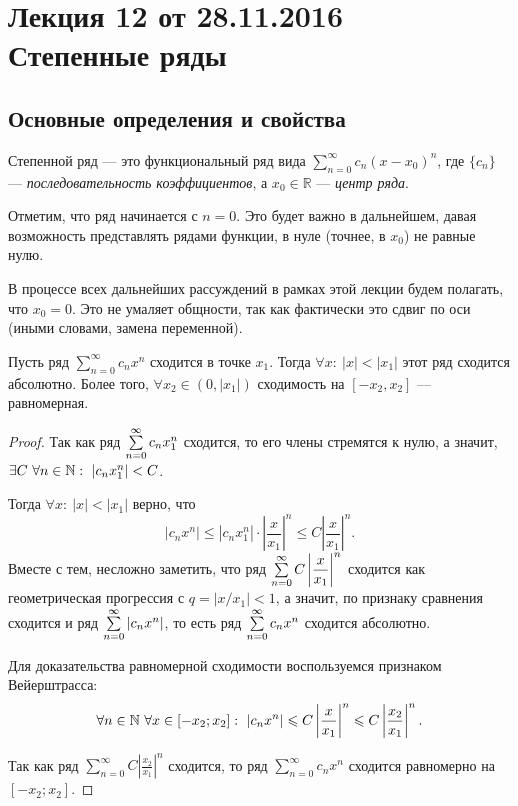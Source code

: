 \documentclass[a4paper, 12pt]{article}
\begin{document}
\pagestyle{fancy}
\section{Лекция 12 от 28.11.2016 \\ Степенные ряды}

\subsection{Основные определения и свойства}
\begin{Def}
	Степенной ряд --- это функциональный ряд вида $\sum\limits_{n = 0}^{\infty}c_n (x-x_0)^n$, где $\{c_n\}$ --- \textit{последовательность коэффициентов}, а $x_0 \in \mathbb{R}$ ---  \textit{центр ряда}.
\end{Def}

Отметим, что ряд начинается с $n = 0$. Это будет важно в дальнейшем, давая возможность представлять рядами функции, в нуле (точнее, в $x_0$) не равные нулю.

В процессе всех дальнейших рассуждений в рамках этой лекции будем полагать, что $x_0 = 0$. Это не умаляет общности, так как фактически это сдвиг по оси (иными словами, замена переменной).

\begin{Theorem} [Абеля I]
	Пусть ряд $\sum\limits_{n = 0}^{\infty}c_n x^n$ сходится в точке $x_1$. Тогда $\forall x:\ |x| < |x_1|$ этот ряд сходится абсолютно. Более того, $\forall x_2 \in (0, |x_1|)$ сходимость на $[-x_2, x_2]$ --- равномерная.
\end{Theorem}
\begin{proof}
	Так как ряд $\sum\limits_{n=0}^{\infty} c_nx_1^n$ сходится, то его члены стремятся к нулю, а значит, $\exists C\ \forall n \in \mathbb{N}:\ |c_nx_1^n| < C$. 
	
	Тогда $\forall x:\ |x| < |x_1|$ верно, что 
	$$
	|c_nx^n| \leq |c_nx_1^n| \cdot \left| \dfrac{x}{x_1} \right|^n \leq C \left| \dfrac{x}{x_1} \right|^n.
	$$
	Вместе с тем, несложно заметить, что ряд $\sum\limits_{n=0}^{\infty} C \left|\dfrac{x}{x_1}\right|^n$ сходится как геометрическая прогрессия с $q = |x/x_1| < 1$, а значит, по признаку сравнения сходится и ряд $\sum\limits_{n=0}^{\infty} |c_nx^n|$, то есть ряд $\sum\limits_{n=0}^{\infty} c_nx^n$ сходится абсолютно.
	
	Для доказательства равномерной сходимости воспользуемся признаком Вейерштрасса:
	$$
	\forall n \in \mathbb{N}\ \forall x \in [-x_2; x_2]:\ |c_nx^n| \leqslant C\left|\frac{x}{x_1} \right|^n \leqslant C\left|\frac{x_2}{x_1}\right|^n.
	$$
	
	Так как ряд $\sum\limits_{n=0}^{\infty} C\left|\frac{x_2}{x_1} \right|^n$ сходится, то ряд $\sum\limits_{n = 0}^{\infty}c_n x^n$ сходится равномерно на $[-x_2; x_2]$.
\end{proof}
\end{document}
